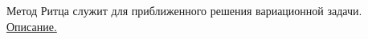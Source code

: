 \setcounter{equation}{0}
Метод Ритца служит для приближенного решения вариационной задачи. \href{http://reslib.com/book/Chislennie_metodi_analiza__Priblizhenie_funkcij__differencialjnie_i_integraljnie_uravneniya/321}{Описание.} %






